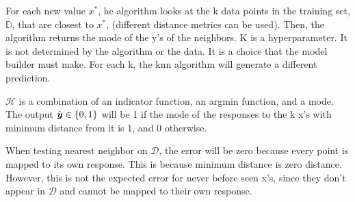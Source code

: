 \documentclass[12pt]{article}
\begin{document}

\begin{enumerate}


For each new value $x^*$, he algorithm looks at the k data points in the training set, $\mathbb{D}$, that are closest to $x^*$, (different distance metrics can be used). Then, the algorithm returns the mode of the y's of the neighbors.  K is a hyperparameter. It is not determined by the algorithm or the data. It is a choice that the model builder must make. For each k, the knn algorithm will generate a different prediction.


$\mathcal{H}$ is a combination of an indicator function, an argmin function, and a mode. 
The output $\hat{\boldsymbol{y}} \in \left\{0, 1\right\}$ will be 1 if the mode of the responses to the k x's with minimum distance from it is 1, and 0 otherwise. 


When testing nearest neighbor on $\mathcal{D}$, the error will be zero because every point is mapped to its own response. This is because minimum distance is zero distance. 
However, this is not the expected error for never before seen x's, since they don't appear in $\mathcal{D}$ and cannot be mapped to their own response. 

\end{enumerate}

\end{document}
